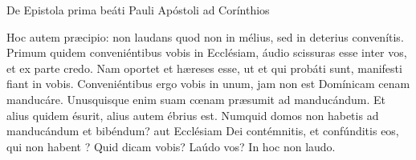 
De Epistola prima beáti Pauli Apóstoli ad Corínthios

Hoc autem præcipio: non laudans quod non in mélius, sed in deterius convenítis.
Primum quidem conveniéntibus vobis in Ecclésiam, áudio scissuras esse inter vos, et ex parte credo.
Nam oportet et hæreses esse, ut et qui probáti sunt, manifesti fiant in vobis.
Conveniéntibus ergo vobis in unum, jam non est Domínicam cenam manducáre.
Unusquisque enim suam cœnam præsumit ad manducándum. Et alius quidem ésurit, alius autem ébrius est.
Numquid domos non habetis ad manducándum et bibéndum? aut Ecclésiam Dei contémnitis, et confúnditis eos, qui non habent ? Quid dicam vobis? Laúdo vos? In hoc non laudo.
\par